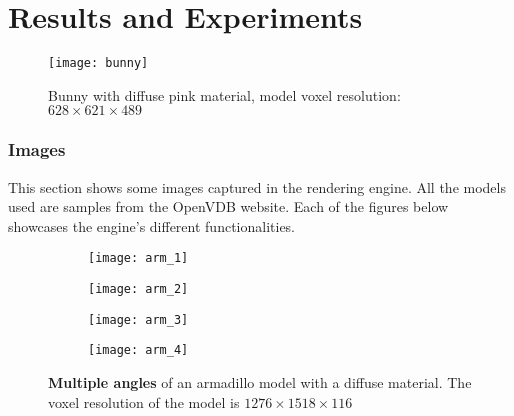 
\part{Results and Experiments}\label{results}

\begin{figure}[H]
  \centering
  \texttt{[image: bunny]}
  \caption{Bunny with diffuse pink material, model voxel resolution: $628\times621\times489$}
\end{figure}

\section{Images}

This section shows some images captured in the rendering engine. All the models used are samples from the OpenVDB website\supercite{openvdb:models}. Each of the figures below showcases the engine's different functionalities.

\begin{figure}[H]
  \centering
  \begin{subfigure}[b]{0.48\textwidth}
    \texttt{[image: arm\_1]}
  \end{subfigure}
  \hfill
  \begin{subfigure}[b]{0.48\textwidth}
    \texttt{[image: arm\_2]}
  \end{subfigure}
  \begin{subfigure}[b]{0.48\textwidth}
    \texttt{[image: arm\_3]}
  \end{subfigure}
  \hfill
  \begin{subfigure}[b]{0.48\textwidth}
    \texttt{[image: arm\_4]}
  \end{subfigure}
  \caption{\textbf{Multiple angles} of an armadillo model with a diffuse material. The voxel resolution of the model is $1276\times1518\times116$}
\end{figure}

